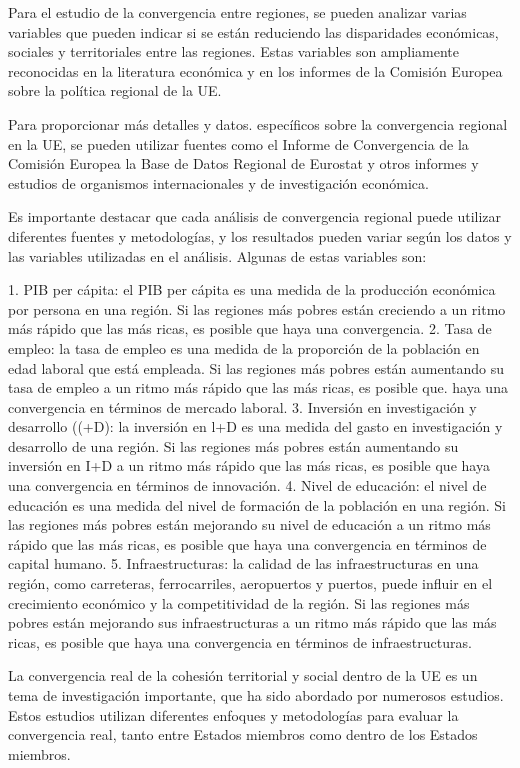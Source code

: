 \documentclass[10pt,a4paper]{article}
\begin{document}
Para el estudio de la convergencia entre regiones, se pueden analizar varias variables que pueden indicar si se están reduciendo las disparidades económicas, sociales y territoriales entre las regiones. Estas variables son ampliamente reconocidas en la literatura económica y en los informes de la Comisión Europea sobre la política regional de la UE.

Para proporcionar más detalles y datos. específicos sobre la convergencia regional en la UE, se pueden utilizar fuentes como el Informe de Convergencia de la Comisión Europea la Base de Datos Regional de Eurostat y otros informes y estudios de organismos internacionales y de investigación económica.

Es importante destacar que cada análisis de convergencia regional puede utilizar diferentes fuentes y metodologías, y los resultados pueden variar según los datos y las variables utilizadas en el análisis. Algunas de estas variables son:

1. PIB per cápita: el PIB per cápita es una medida de la producción económica por persona en una región. Si las regiones más pobres están creciendo a un ritmo más rápido que las más ricas, es posible que haya una convergencia.
2. Tasa de empleo: la tasa de empleo es una medida de la proporción de la población en edad laboral que está empleada. Si las regiones más pobres están aumentando su tasa de empleo a un ritmo más rápido que las más ricas, es posible que. haya una convergencia en términos de mercado laboral.
3. Inversión en investigación y desarrollo ((+D): la inversión en l+D es una medida del gasto en investigación y desarrollo de una región. Si las regiones más pobres están aumentando su inversión en I+D a un ritmo más rápido que las más ricas, es posible que haya una convergencia en términos de innovación.
4. Nivel de educación: el nivel de educación es una medida del nivel de formación de la población en una región. Si las regiones más pobres están mejorando su nivel de educación a un ritmo más rápido que las más ricas, es posible que haya una convergencia en términos de capital humano.
5. Infraestructuras: la calidad de las infraestructuras en una región, como carreteras, ferrocarriles, aeropuertos y puertos, puede influir en el crecimiento económico y la competitividad de la región. Si las regiones más pobres están mejorando sus infraestructuras a un ritmo más rápido que las más ricas, es posible que haya una convergencia en términos de infraestructuras.

La convergencia real de la cohesión territorial y social dentro de la UE es un tema de investigación importante, que ha sido abordado por numerosos estudios. Estos estudios utilizan diferentes enfoques y metodologías para evaluar la convergencia real, tanto entre Estados miembros como dentro de los Estados miembros.
\end{document}
